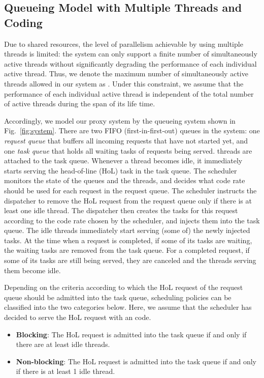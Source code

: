 \documentclass[journal]{IEEEtran}
\begin{document}
\subsection{Queueing Model with Multiple Threads and Coding}
Due to shared  resources, the level of parallelism achievable by using multiple threads is limited: the system can only support a finite number of simultaneously active threads without significantly degrading the performance of each individual active thread. Thus, we denote the maximum number of simultaneously active threads allowed in our system as .
Under this constraint, we assume that the performance of each individual active thread is independent of the total number of active threads during the span of its life time.  

Accordingly, we model our proxy system by the queueing system shown in Fig.~\ref{fig:system}. There are two FIFO (first-in-first-out) queues in the system: one {\em request queue} that buffers all incoming requests that have not started yet, and one {\em task queue} that holds all waiting tasks of requests being served.  threads are attached to the task queue. Whenever a thread becomes idle, it immediately starts serving the head-of-line (HoL) task in the task queue. The scheduler monitors the state of the queues and the threads, and decides what code rate should be used for each request in the request queue. The scheduler instructs the dispatcher to remove the HoL request from the request queue only if there is at least one idle thread. The dispatcher then creates the tasks for this request according to the code rate chosen by the scheduler, and injects them into the task queue. The idle threads immediately start serving (some of) the newly injected tasks. At the time when a request is completed, if some of its tasks are waiting, the waiting tasks are removed from the task queue. For a completed request,  if some of its tasks are still being served, they are canceled and the threads serving them become idle.



Depending on the criteria according to which the HoL request of the request queue should be admitted into the task queue, scheduling policies can be classified into the two categories below. Here, we assume that the scheduler has decided to serve the HoL request with an  code.
\begin{itemize}
\item {\bf Blocking}: The HoL request is admitted into the task queue if and only if there are at least  idle threads. 

\item {\bf Non-blocking}: The HoL request is admitted into the task queue if and only if there is at least 1 idle thread.
\end{itemize} 
 
\end{document}
